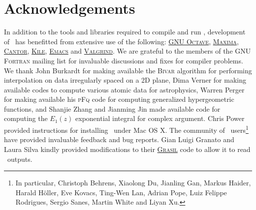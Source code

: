 \chapter{Acknowledgements}

In addition to the tools and libraries required to compile and run \glc, development of \glc\ has benefitted from extensive use of the following: \href{http://www.gnu.org/software/octave/}{{\normalfont \scshape GNU Octave}}, \href{http://maxima.sourceforge.net/}{{\normalfont \scshape Maxima}}, \href{http://edu.kde.org/cantor/}{{\normalfont \scshape Cantor}}, \href{http://kile.sourceforge.net/}{{\normalfont \scshape Kile}}, \href{http://www.gnu.org/software/emacs/}{{\normalfont \scshape Emacs}} and \href{http://valgrind.org/}{{\normalfont \scshape Valgrind}}. We are grateful to the members of the {\normalfont \scshape GNU Fortran} mailing list for invaluable discussions and fixes for compiler problems. We thank John Burkardt for making available the {\normalfont \scshape Bivar} algorithm for performing interpolation on data irregularly spaced on a 2D plane, Dima Verner for making available codes to compute various atomic data for astrophysics, Warren Perger for making available his {\normalfont \scshape pFq} code for computing generalized hypergeometric functions, and Shanjie Zhang and Jianming Jin made available code for computing the $E_1(z)$ exponential integral for complex argument. Chris Power provided instructions for installing \glc\ under Mac OS X. The community of \glc\ users\footnote{In particular, Christoph Behrens, Xiaolong Du, Jianling Gan, Markus Haider, Harald H\"oller, Eve Kovacs, Ting-Wen Lan, Adrian Pope, Luiz Felippe Rodrigues, Sergio Sanes, Martin White and Liyan Xu.} have provided invaluable feedback and bug reports. Gian Luigi Granato and Laura Silva kindly provided modifications to their \href{http://adlibitum.oat.ts.astro.it/silva/grasil/grasil.html}{\normalfont \scshape Grasil} code to allow it to read \glc\ outputs.
